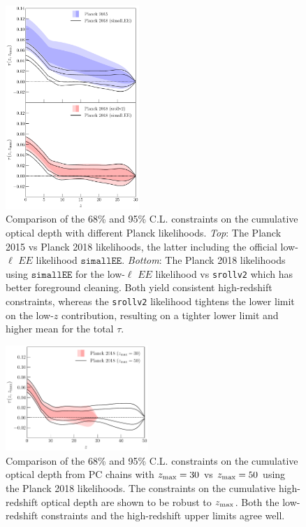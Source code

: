 \documentclass[prd,twocolumn,amsmath,amssymb,floatfix,superscriptaddress,nofootinbib]{revtex4-1}
\newcommand{\zmax}{z_{\rm max}}
\begin{document}
{\begin{figure}[ht]
\includegraphics[width=0.45\textwidth]{paper/plots/pl18_taugtz_pc_zmax30_pl15_vs_pl18_simallEE_vs_pl18_srollv2.pdf}
\caption{Comparison of the 68\% and 95\% C.L. constraints on the cumulative optical depth with different Planck likelihoods. \textit{Top}: The Planck 2015 vs Planck 2018 likelihoods, the latter including the official low-$\ell$ $EE$ likelihood $\texttt{simallEE}$. \textit{Bottom}: The Planck 2018 likelihoods using $\texttt{simallEE}$ for the low-$\ell$ $EE$ likelihood vs \texttt{srollv2} which has better foreground cleaning. Both yield consistent high-redshift constraints, whereas the \texttt{srollv2} likelihood tightens the lower limit on the low-$z$ contribution, resulting on a tighter lower limit and higher mean for the total $\tau$. 
}
\label{fig:plot_taugtz_2015_vs_2018_simallEE_vs_2018_srollv2}
\end{figure}


\begin{figure}[ht]
\includegraphics[width=0.48\textwidth]{paper/plots/pl18_taugtz_pl18_srollv2_pc_zmax30_vs_zmax50.pdf}
\caption{Comparison of the 68\% and 95\% C.L. constraints on the cumulative optical depth from PC chains with $\zmax = 30$ vs $\zmax = 50$ using the Planck 2018 likelihoods. The constraints on the cumulative high-redshift optical depth are shown to be robust to $\zmax$. Both the low-redshift constraints and the high-redshift upper limits agree well. 
}
\label{fig:plot_taugtz_zmax30_vs_zmax50}
\end{figure}


}
\end{document}
